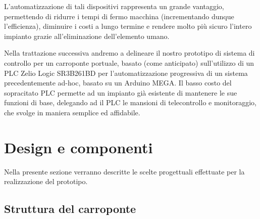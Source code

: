 L'automatizzazione di tali dispositivi rappresenta un grande vantaggio, permettendo di ridurre i
tempi di fermo macchina (incrementando dunque l'efficienza), diminuire i costi a lungo termine e
rendere molto più sicuro l'intero impianto grazie all'eliminazione dell'elemento umano.
\cite{gupta2004simplified}

Nella trattazione successiva andremo a delineare il nostro prototipo di sistema di controllo per un
carroponte portuale, basato (come anticipato) sull'utilizzo di un PLC Zelio Logic SR3B261BD per
l'automatizzazione progressiva di un sistema precedentemente ad-hoc, basato su un Arduino MEGA. Il
basso costo del sopracitato PLC permette ad un impianto già esistente di mantenere le sue funzioni
di base, delegando ad il PLC le mansioni di telecontrollo e monitoraggio, che svolge in maniera
semplice ed affidabile.

\section{Design e componenti}

Nella presente sezione verranno descritte le scelte progettuali effettuate per la realizzazione del
prototipo.

\subsection{Struttura del carroponte}

